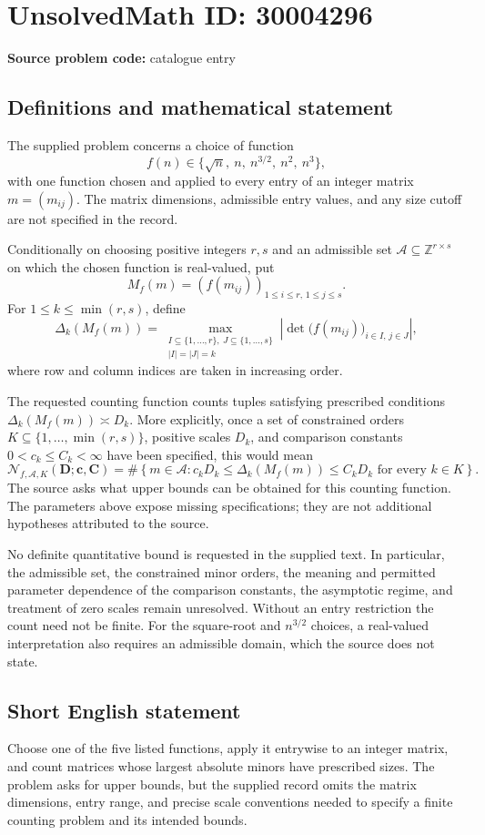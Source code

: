 \documentclass[11pt]{article}
\newcommand{\Z}{\mathbb{Z}}
\begin{document}
\section*{UnsolvedMath ID: 30004296}
\textbf{Source problem code:} catalogue entry
\subsection{Definitions and mathematical statement}
The supplied problem concerns a choice of function
\[
f(n)\in\{\sqrt n,\ n,\ n^{3/2},\ n^2,\ n^3\},
\]
with one function chosen and applied to every entry of an integer matrix \(m=(m_{ij})\). The matrix dimensions, admissible entry values, and any size cutoff are not specified in the record.

Conditionally on choosing positive integers \(r,s\) and an admissible set \(\mathcal A\subseteq\Z^{r\times s}\) on which the chosen function is real-valued, put
\[
M_f(m)=(f(m_{ij}))_{1\le i\le r,\,1\le j\le s}.
\]
For \(1\le k\le\min(r,s)\), define
\[
\Delta_k(M_f(m))=
\max_{\substack{I\subseteq\{1,\ldots,r\},\ J\subseteq\{1,\ldots,s\}\\ |I|=|J|=k}}
\left|\det\bigl(f(m_{ij})\bigr)_{i\in I,\,j\in J}\right|,
\]
where row and column indices are taken in increasing order.

The requested counting function counts tuples satisfying prescribed conditions \(\Delta_k(M_f(m))\asymp D_k\). More explicitly, once a set of constrained orders \(K\subseteq\{1,\ldots,\min(r,s)\}\), positive scales \(D_k\), and comparison constants \(0<c_k\le C_k<\infty\) have been specified, this would mean
\[
\mathcal N_{f,\mathcal A,K}(\mathbf D;\mathbf c,\mathbf C)
=
\#\left\{m\in\mathcal A:
 c_kD_k\le\Delta_k(M_f(m))\le C_kD_k
 \text{ for every }k\in K\right\}.
\]
The source asks what upper bounds can be obtained for this counting function. The parameters above expose missing specifications; they are not additional hypotheses attributed to the source.

No definite quantitative bound is requested in the supplied text. In particular, the admissible set, the constrained minor orders, the meaning and permitted parameter dependence of the comparison constants, the asymptotic regime, and treatment of zero scales remain unresolved. Without an entry restriction the count need not be finite. For the square-root and \(n^{3/2}\) choices, a real-valued interpretation also requires an admissible domain, which the source does not state.
\subsection{Short English statement}
Choose one of the five listed functions, apply it entrywise to an integer matrix, and count matrices whose largest absolute minors have prescribed sizes. The problem asks for upper bounds, but the supplied record omits the matrix dimensions, entry range, and precise scale conventions needed to specify a finite counting problem and its intended bounds.
\end{document}
